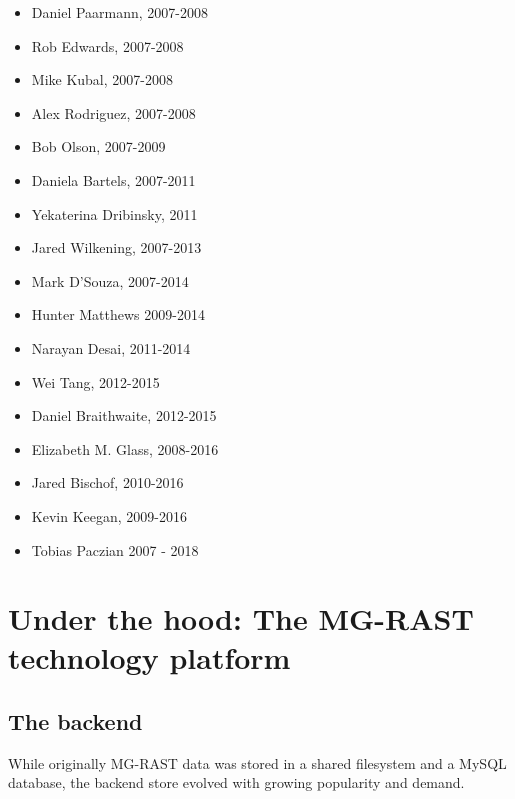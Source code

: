 \documentclass[12pt,fullpage]{report}
\begin{document}
\begin{itemize}
\item    Daniel Paarmann, 2007-2008
\item    Rob Edwards, 2007-2008
\item    Mike Kubal, 2007-2008
\item    Alex Rodriguez, 2007-2008
\item    Bob Olson, 2007-2009
\item    Daniela Bartels, 2007-2011
\item    Yekaterina Dribinsky, 2011
\item    Jared Wilkening, 2007-2013
\item    Mark D'Souza, 2007-2014
\item    Hunter Matthews 2009-2014
\item    Narayan Desai, 2011-2014
\item    Wei Tang,  2012-2015
\item  Daniel Braithwaite, 2012-2015
\item   Elizabeth M. Glass, 2008-2016
\item  Jared Bischof, 2010-2016
\item Kevin Keegan, 2009-2016

\item Tobias Paczian 2007 - 2018


\end{itemize}



\chapter{Under the hood: The MG-RAST technology platform}

\section{The backend}

While originally MG-RAST data was stored in a shared filesystem and a MySQL database, the backend store evolved with growing popularity and demand.
\end{document}
